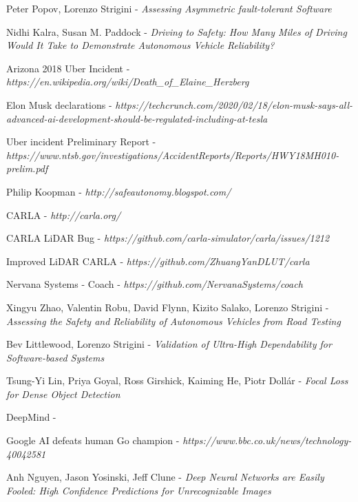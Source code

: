 \begin{thebibliography}{9}

Peter Popov, Lorenzo Strigini - \textit{Assessing Asymmetric fault-tolerant Software}

Nidhi Kalra, Susan M. Paddock - \textit{Driving to Safety: How Many Miles of Driving Would It Take to Demonstrate Autonomous Vehicle Reliability?}

Arizona 2018 Uber Incident - \textit{https://en.wikipedia.org/wiki/Death\_of\_Elaine\_Herzberg}

Elon Musk declarations - \textit{https://techcrunch.com/2020/02/18/elon-musk-says-all-advanced-ai-development-should-be-regulated-including-at-tesla}

Uber incident Preliminary Report - \textit{https://www.ntsb.gov/investigations/AccidentReports/Reports/HWY18MH010-prelim.pdf}

Philip Koopman - \textit{http://safeautonomy.blogspot.com/}

CARLA - \textit{http://carla.org/}

CARLA LiDAR Bug - \textsl{https://github.com/carla-simulator/carla/issues/1212}


Improved LiDAR CARLA - \textsl{https://github.com/ZhuangYanDLUT/carla}

Nervana Systems - Coach - \textit{https://github.com/NervanaSystems/coach}

Xingyu Zhao, Valentin Robu, David Flynn, Kizito Salako, Lorenzo Strigini - \textit{Assessing the Safety and Reliability of Autonomous Vehicles from Road Testing}

Bev Littlewood, Lorenzo Strigini - \textit{Validation of Ultra-High Dependability for Software-based Systems}

Tsung-Yi Lin, Priya Goyal, Ross Girshick, Kaiming He, Piotr Dollár - \textit{Focal Loss for Dense Object Detection}

DeepMind - 

Google AI defeats human Go champion - \textit{https://www.bbc.co.uk/news/technology-40042581}

Anh Nguyen, Jason Yosinski, Jeff Clune - \textit{Deep Neural Networks are Easily Fooled: High Confidence Predictions for Unrecognizable Images}


\end{thebibliography}
